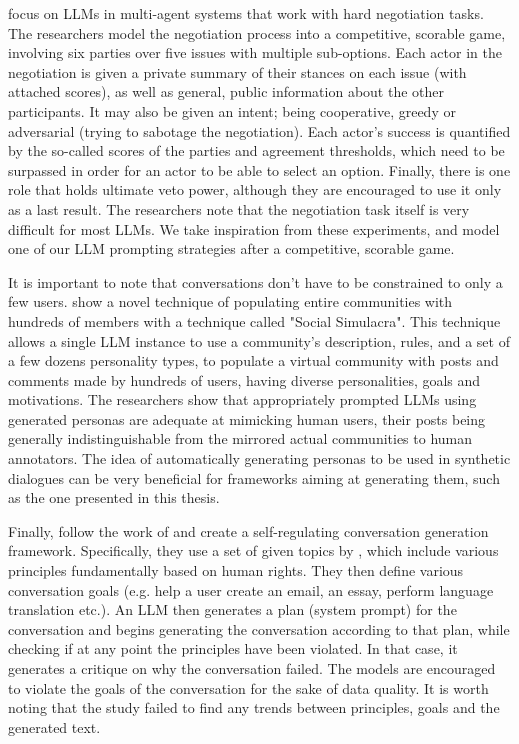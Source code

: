 \citet{abdelnabi2024cooperationcompetitionmaliciousnessllmstakeholders} focus on LLMs in multi-agent systems that work with hard negotiation tasks. The researchers model the negotiation process into a competitive, scorable game, involving six parties over five issues with multiple sub-options. Each actor in the negotiation is given a private summary of their stances on each issue (with attached scores), as well as general, public information about the other participants. It may also be given an intent; being cooperative, greedy or adversarial (trying to sabotage the negotiation). Each actor's success is quantified by the so-called scores of the parties and agreement thresholds, which need to be surpassed in order for an actor to be able to select an option. Finally, there is one role that holds ultimate veto power, although they are encouraged to use it only as a last result. The researchers note that the negotiation task itself is very difficult for most LLMs. We take inspiration from these experiments, and model one of our LLM prompting strategies after a competitive, scorable game.

It is important to note that conversations don't have to be constrained to only a few users. \citet{park2022socialsimulacracreatingpopulated} show a novel technique of populating entire communities with hundreds of members with a technique called "Social Simulacra". This technique allows a single LLM instance to use a community's description, rules, and a set of a few dozens personality types, to populate a virtual community with posts and comments made by hundreds of users, having diverse personalities, goals and motivations. The researchers show that appropriately prompted LLMs using generated personas are adequate at mimicking human users, their posts being generally indistinguishable from the mirrored actual communities to human annotators. The idea of automatically generating personas to be used in synthetic dialogues can be very beneficial for frameworks aiming at generating them, such as the one presented in this thesis.


Finally, \citet{lambert2024selfdirectedsyntheticdialoguesrevisions} follow the work of \citet{Bai2022ConstitutionalAH} and create a self-regulating conversation generation framework. Specifically, they use a set of given topics by \citet{Castricato2024SuppressingPE}, which include various principles fundamentally based on human rights. They then define various conversation goals (e.g. help a user create an email, an essay, perform language translation etc.). An LLM then generates a plan (system prompt) for the conversation and begins generating the conversation according to that plan, while checking if at any point the principles have been violated. In that case, it generates a critique on why the conversation failed. The models are encouraged to violate the goals of the conversation for the sake of data quality. It is worth noting that the study failed to find any trends between principles, goals and the generated text.

